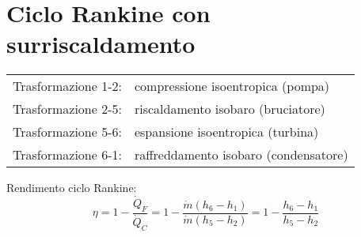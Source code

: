 \section{Ciclo Rankine con surriscaldamento}

\begin{tabular}{p{2.5cm}l}
Trasformazione 1-2: & compressione isoentropica (pompa)\\
Trasformazione 2-5: & riscaldamento isobaro (bruciatore)\\
Trasformazione 5-6: & espansione isoentropica (turbina)\\
Trasformazione 6-1: & raffreddamento isobaro (condensatore)\\
\end{tabular}

Rendimento ciclo Rankine:
\[ \eta = 1 - \frac{\dot{Q}_F}{\dot{Q}_C} = 1 - \frac{\dot{m}(h_6-h_1)}{\dot{m}(h_5-h_2)} = 1 - \frac{h_6-h_1}{h_5-h_2} \]
